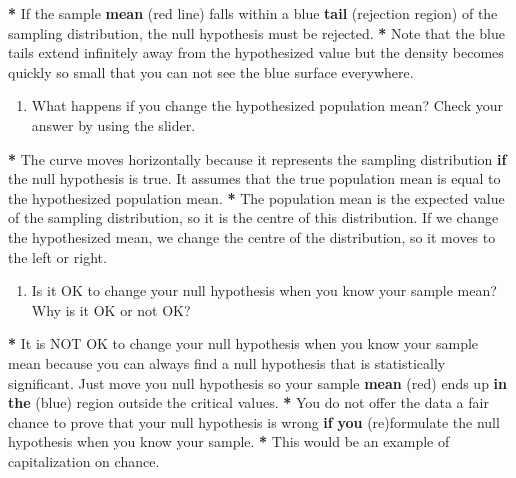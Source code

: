 \documentclass[a4paper]{book}
\newenvironment{Shaded}{\begin{snugshade}}{\end{snugshade}}
\newcommand{\KeywordTok}[1]{\textcolor[rgb]{0,0,0}{\textbf{#1}}}
\newcommand{\StringTok}[1]{\textcolor[rgb]{0.00,0.00,0.00}{#1}}
\newcommand{\ControlFlowTok}[1]{\textcolor[rgb]{0.00,0.00,0.00}{\textbf{#1}}}
\newcommand{\OperatorTok}[1]{\textcolor[rgb]{0.00,0.00,0.00}{\textbf{#1}}}
\newcommand{\NormalTok}[1]{#1}
\providecommand{\tightlist}{%
  \setlength{\itemsep}{0pt}\setlength{\parskip}{0pt}}
\theoremstyle{definition}
\theoremstyle{definition}
\theoremstyle{definition}
\theoremstyle{remark}
\begin{document}
\begin{Shaded}
\begin{Highlighting}[]
\OperatorTok{*}\StringTok{ }\NormalTok{If the sample }\KeywordTok{mean}\NormalTok{ (red line) falls within a blue }\KeywordTok{tail}\NormalTok{ (rejection region)}
\NormalTok{of the sampling distribution, the null hypothesis must be rejected.}
\OperatorTok{*}\StringTok{ }\NormalTok{Note that the blue tails extend infinitely away from the hypothesized value}
\NormalTok{but the density becomes quickly so small that you can not see the blue surface}
\NormalTok{everywhere.}
\end{Highlighting}
\end{Shaded}

\begin{enumerate}
\def\labelenumi{\arabic{enumi}.}
\setcounter{enumi}{4}
\tightlist
\item
  What happens if you change the hypothesized population mean? Check
  your answer by using the slider.
\end{enumerate}

\begin{Shaded}
\begin{Highlighting}[]
\OperatorTok{*}\StringTok{ }\NormalTok{The curve moves horizontally because it represents the sampling distribution}
\ControlFlowTok{if}\NormalTok{ the null hypothesis is true. It assumes that the true population mean is}
\NormalTok{equal to the hypothesized population mean.}
\OperatorTok{*}\StringTok{ }\NormalTok{The population mean is the expected value of the sampling distribution, so}
\NormalTok{it is the centre of this distribution. If we change the hypothesized mean, we}
\NormalTok{change the centre of the distribution, so it moves to the left or right.}
\end{Highlighting}
\end{Shaded}

\begin{enumerate}
\def\labelenumi{\arabic{enumi}.}
\setcounter{enumi}{5}
\tightlist
\item
  Is it OK to change your null hypothesis when you know your sample
  mean? Why is it OK or not OK?
\end{enumerate}

\begin{Shaded}
\begin{Highlighting}[]
\OperatorTok{*}\StringTok{ }\NormalTok{It is NOT OK to change your null hypothesis when you know your sample mean}
\NormalTok{because you can always find a null hypothesis that is statistically}
\NormalTok{significant. Just move you null hypothesis so your sample }\KeywordTok{mean}\NormalTok{ (red) ends up}
\ControlFlowTok{in} \KeywordTok{the}\NormalTok{ (blue) region outside the critical values.}
\OperatorTok{*}\StringTok{ }\NormalTok{You do not offer the data a fair chance to prove that your null hypothesis is}
\NormalTok{wrong }\ControlFlowTok{if} \KeywordTok{you}\NormalTok{ (re)formulate the null hypothesis when you know your sample.}
\OperatorTok{*}\StringTok{ }\NormalTok{This would be an example of capitalization on chance.}
\end{Highlighting}
\end{Shaded}
\end{document}
